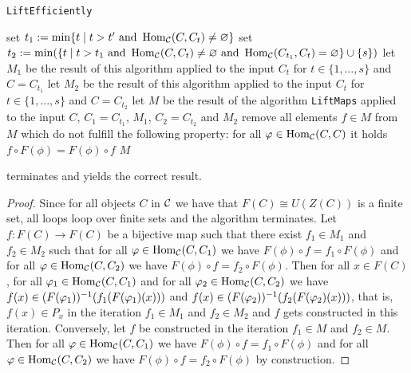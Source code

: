 \begin{algorithm}\capstart
    \caption{\texttt{LiftEfficiently}}\label{algo:LiftEfficiently}
	\BlankLine
	\BlankLine
	set $t_1 := \min\{t \mid t > t'\text{ and }\operatorname{Hom}_{\mathcal{C}}(C,C_t) \neq \varnothing\}$\;
	set $t_2 := \min(\{t \mid t > t_1\text{ and }\operatorname{Hom}_{\mathcal{C}}(C,C_t) \neq \varnothing\text{ and } \operatorname{Hom}_{\mathcal{C}}(C_{t_1},C_t) = \varnothing\} \cup \{s\})$\;
	\BlankLine
	let $M_1$ be the result of this algorithm applied to the input $C_t$ for $t \in \{1,\dots,s\}$ and $C = C_{t_1}$\;
	let $M_2$ be the result of this algorithm applied to the input $C_t$ for $t \in \{1,\dots,s\}$ and $C = C_{t_2}$\;
	\BlankLine
	let $M$ be the result of the algorithm \texttt{LiftMaps} applied to the input $C$, $C_1 = C_{t_1}$, $M_1$, $C_2 = C_{t_2}$ and $M_2$\;
	remove all elements $f \in M$ from $M$ which do not fulfill the following property: for all $\varphi \in \operatorname{Hom}_{\mathcal{C}}(C,C)$ it holds $f \circ F(\phi) = F(\phi) \circ f$ \label{line:compatibility}\;
	\BlankLine
	\Return $M$\;
\end{algorithm}

\begin{prop}\label{prop:LiftMaps_correct}
 terminates and yields the correct result.
\end{prop}
\begin{proof}
Since for all objects $C$ in $\mathcal{C}$ we have that $F(C) \cong U(Z(C))$ is a finite set, all loops loop over finite sets and the algorithm terminates. Let $f \colon F(C) \to F(C)$ be a bijective map such that there exist $f_1 \in M_1$ and $f_2 \in M_2$ such that for all $\varphi \in \operatorname{Hom}_{\mathcal{C}}(C,C_1)$ we have $F(\phi) \circ f = f_1 \circ F(\phi)$ and for all $\varphi \in \operatorname{Hom}_{\mathcal{C}}(C,C_2)$ we have $F(\phi) \circ f = f_2 \circ F(\phi)$. Then for all $x \in F(C)$, for all $\varphi_1 \in \operatorname{Hom}_{\mathcal{C}}(C,C_1)$ and for all $\varphi_2 \in \operatorname{Hom}_{\mathcal{C}}(C,C_2)$ we have $f(x) \in (F(\varphi_1))^{-1}(f_1(F(\varphi_1)(x)))$ and $f(x) \in (F(\varphi_2))^{-1}(f_2(F(\varphi_2)(x)))$, that is, $f(x) \in P_x$ in the iteration $f_1 \in M_1$ and $f_2 \in M_2$ and $f$ gets constructed in this iteration. Conversely, let $f$ be constructed in the iteration $f_1 \in M$ and $f_2 \in M$. Then for all $\varphi \in \operatorname{Hom}_{\mathcal{C}}(C,C_1)$ we have $F(\phi) \circ f = f_1 \circ F(\phi)$ and for all $\varphi \in \operatorname{Hom}_{\mathcal{C}}(C,C_2)$ we have $F(\phi) \circ f = f_2 \circ F(\phi)$ by construction.
\end{proof}

